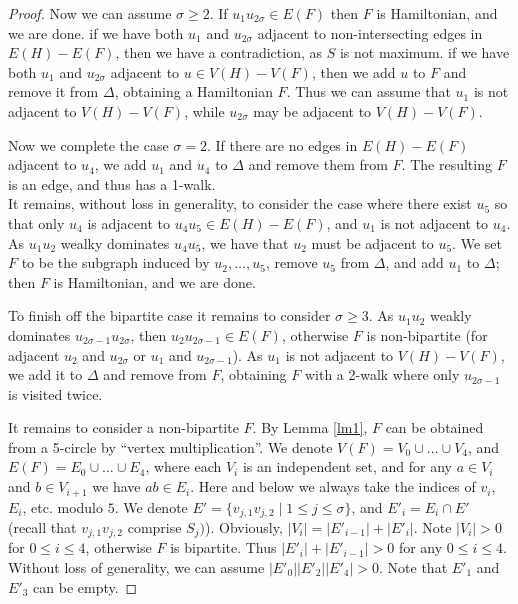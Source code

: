 \documentclass{amsart}
\theoremstyle{definition}
\begin{document}
\begin{proof}
Now we can assume $\sigma\geq 2$.
If $u_1u_{2\sigma}\in E(F)$ then $F$ is
Hamiltonian, and we are done. 
if we have both $u_1$ and $u_{2\sigma}$ adjacent to non-intersecting edges in $E(H)-E(F)$, 
then we have a contradiction, as $S$ is not maximum.
if we have both $u_1$ and $u_{2\sigma}$ adjacent to  $u\in V(H)-V(F)$, 
then we add $u$ to $F$ and remove it from $\Delta$, obtaining
a Hamiltonian $F$.
Thus we can assume that $u_1$ is not adjacent to  $V(H)-V(F)$, 
while $u_{2\sigma}$ may be adjacent to  $V(H)-V(F)$. 


Now we complete the case $\sigma=2$. 
If there are no edges in $E(H)-E(F)$ adjacent to $u_4$, 
we add $u_1$ and $u_4$ to $\Delta$ and remove them from $F$. 
The resulting $F$ is an edge, and thus has a 1-walk.\\
It remains, without loss in generality,
to consider the case where there exist $u_5$ so that only $u_4$ is adjacent to 
$u_4u_5\in E(H)-E(F)$, and $u_1$ is not
adjacent to $u_4$. As $u_1u_2$ wealky dominates $u_4u_5$, we have that $u_2$ must be 
adjacent to $u_5$. 
We set $F$ to be the subgraph induced by
$u_2,\dots,u_5$, remove $u_5$ from $\Delta$, and add $u_1$ to $\Delta$; then $F$ is Hamiltonian, and we are done.

To finish off the bipartite case it remains to consider $\sigma\geq 3$.
As $u_1u_2$ weakly dominates $u_{2\sigma-1}u_{2\sigma}$, then $u_2u_{2\sigma-1}\in E(F)$, 
otherwise $F$ is
non-bipartite (for adjacent $u_2$ and $u_{2\sigma}$ or $u_1$ and $u_{2\sigma-1}$).
As $u_1$ is not adjacent to   $V(H)-V(F)$, we add it to $\Delta$ and remove from $F$,
obtaining $F$ with a 2-walk where only $u_{2\sigma-1}$ is visited twice. 


\medskip

It remains to consider a non-bipartite $F$. By Lemma \ref{lm1},
$F$ can be obtained from a 5-circle by ``vertex multiplication''. We
denote $V(F)=V_0\cup \dots \cup V_4$, and
$E(F)=E_0\cup \dots \cup E_4$, where each $V_i$ is an
independent set, and  for any $a\in V_i$ and $b\in V_{i+1}$ we have $ab\in E_i$. 
Here and below we always take the indices of $v_i$, $E_i$, etc. modulo $5$.
We denote
$E'=\{v_{j,1}v_{j,2}\mid 1\leq j\leq \sigma\}$, and $E'_i=E_i\cap E'$ (recall that $v_{j,1}v_{j,2}$
comprise $S_{j})$). 
Obviously,
$|V_i|=|E'_{i-1}|+|E'_i|$. Note $|V_i|>0$ for $0\leq i\leq 4$, otherwise
$F$ is bipartite. Thus $|E'_i|+|E'_{i-1}|>0$ for any $0\leq i\leq 4$. 
Without loss of generality, we can assume $|E'_0||E'_2||E'_4|>0$.
Note that $E'_1$ and $E'_3$ can be empty.


\end{proof}
\end{document}
